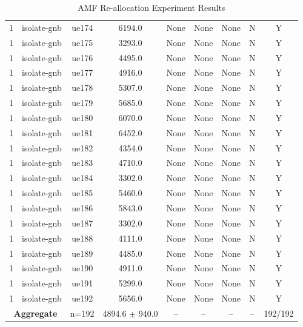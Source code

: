 \begin{table}[ht]
\begin{tabular}{|c|c|c|c|c|c|c|c|c|}
1 & isolate-gnb & ue174 & 6194.0 & None & None & None & N & Y \\
1 & isolate-gnb & ue175 & 3293.0 & None & None & None & N & Y \\
1 & isolate-gnb & ue176 & 4495.0 & None & None & None & N & Y \\
1 & isolate-gnb & ue177 & 4916.0 & None & None & None & N & Y \\
1 & isolate-gnb & ue178 & 5307.0 & None & None & None & N & Y \\
1 & isolate-gnb & ue179 & 5685.0 & None & None & None & N & Y \\
1 & isolate-gnb & ue180 & 6070.0 & None & None & None & N & Y \\
1 & isolate-gnb & ue181 & 6452.0 & None & None & None & N & Y \\
1 & isolate-gnb & ue182 & 4354.0 & None & None & None & N & Y \\
1 & isolate-gnb & ue183 & 4710.0 & None & None & None & N & Y \\
1 & isolate-gnb & ue184 & 3302.0 & None & None & None & N & Y \\
1 & isolate-gnb & ue185 & 5460.0 & None & None & None & N & Y \\
1 & isolate-gnb & ue186 & 5843.0 & None & None & None & N & Y \\
1 & isolate-gnb & ue187 & 3302.0 & None & None & None & N & Y \\
1 & isolate-gnb & ue188 & 4111.0 & None & None & None & N & Y \\
1 & isolate-gnb & ue189 & 4485.0 & None & None & None & N & Y \\
1 & isolate-gnb & ue190 & 4911.0 & None & None & None & N & Y \\
1 & isolate-gnb & ue191 & 5299.0 & None & None & None & N & Y \\
1 & isolate-gnb & ue192 & 5656.0 & None & None & None & N & Y \\
\multicolumn{2}{|c|}{\textbf{Aggregate}} & n=192 & 4894.6 $\pm$ 940.0 & -- & -- & -- & -- & 192/192 \\
\hline
\end{tabular}
\caption{AMF Re-allocation Experiment Results}
\label{tab:amf_realloc}
\end{table}
